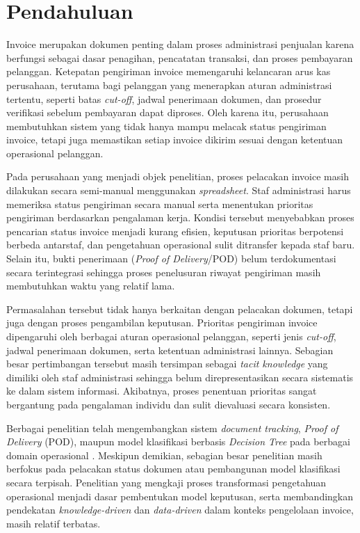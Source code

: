 \section{Pendahuluan}

Invoice merupakan dokumen penting dalam proses administrasi penjualan karena berfungsi sebagai dasar penagihan, pencatatan transaksi, dan proses pembayaran pelanggan. Ketepatan pengiriman invoice memengaruhi kelancaran arus kas perusahaan, terutama bagi pelanggan yang menerapkan aturan administrasi tertentu, seperti batas \textit{cut-off}, jadwal penerimaan dokumen, dan prosedur verifikasi sebelum pembayaran dapat diproses. Oleh karena itu, perusahaan membutuhkan sistem yang tidak hanya mampu melacak status pengiriman invoice, tetapi juga memastikan setiap invoice dikirim sesuai dengan ketentuan operasional pelanggan.

Pada perusahaan yang menjadi objek penelitian, proses pelacakan invoice masih dilakukan secara semi-manual menggunakan \textit{spreadsheet}. Staf administrasi harus memeriksa status pengiriman secara manual serta menentukan prioritas pengiriman berdasarkan pengalaman kerja. Kondisi tersebut menyebabkan proses pencarian status invoice menjadi kurang efisien, keputusan prioritas berpotensi berbeda antarstaf, dan pengetahuan operasional sulit ditransfer kepada staf baru. Selain itu, bukti penerimaan (\textit{Proof of Delivery}/POD) belum terdokumentasi secara terintegrasi sehingga proses penelusuran riwayat pengiriman masih membutuhkan waktu yang relatif lama.

Permasalahan tersebut tidak hanya berkaitan dengan pelacakan dokumen, tetapi juga dengan proses pengambilan keputusan. Prioritas pengiriman invoice dipengaruhi oleh berbagai aturan operasional pelanggan, seperti jenis \textit{cut-off}, jadwal penerimaan dokumen, serta ketentuan administrasi lainnya. Sebagian besar pertimbangan tersebut masih tersimpan sebagai \textit{tacit knowledge} yang dimiliki oleh staf administrasi sehingga belum direpresentasikan secara sistematis ke dalam sistem informasi. Akibatnya, proses penentuan prioritas sangat bergantung pada pengalaman individu dan sulit dievaluasi secara konsisten.

Berbagai penelitian telah mengembangkan sistem \textit{document tracking}, \textit{Proof of Delivery} (POD), maupun model klasifikasi berbasis \textit{Decision Tree} pada berbagai domain operasional \cite{10.1007/978-3-642-55032-4_33,gemma,gunadhya_rajawali_logistik_2021,Siahaan_Doni_2025,firmansyah,afifahdedi}. Meskipun demikian, sebagian besar penelitian masih berfokus pada pelacakan status dokumen atau pembangunan model klasifikasi secara terpisah. Penelitian yang mengkaji proses transformasi pengetahuan operasional menjadi dasar pembentukan model keputusan, serta membandingkan pendekatan \textit{knowledge-driven} dan \textit{data-driven} dalam konteks pengelolaan invoice, masih relatif terbatas.

